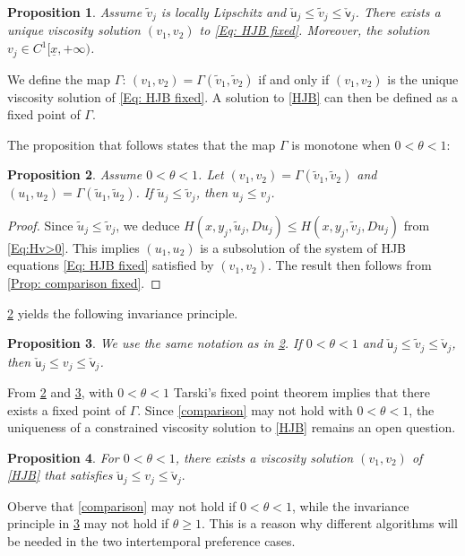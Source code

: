 \documentclass[11pt]{article}
\numberwithin{equation}{section}
\numberwithin{algorithm}{section}
\newtheorem{proposition}[proposition]{Proposition}
\def\su{{\mathsf{u}}}
\def\sv{{\mathsf{v}}}
\newcommand{\ux}{{\underline x}}
\theoremstyle{plain}
\begin{document}
\begin{proposition}
Assume $\widetilde{v}_j$ is locally Lipschitz and $\check{\su}_j\leq \widetilde{v}_j\leq \check{\sv}_j$. There exists a unique viscosity solution $(v_1,v_2)$ to \cref{Eq: HJB fixed}. Moreover, the solution $v_j\in C^1[\ux,+\infty)$. 
\end{proposition}
We define the map $\Gamma$: $(v_1,v_2)=\Gamma(\widetilde{v}_1,\widetilde{v}_2)$ if and only if $(v_1,v_2)$ is the unique viscosity solution of \cref{Eq: HJB fixed}.
A solution to \cref{HJB} can then be defined as a fixed point of $\Gamma$.\par
The proposition that follows states that the map $\Gamma$ is monotone when $0<\theta<1$:
\begin{proposition}\label{Prop: ordering}
Assume $0<\theta<1$. Let $(v_1,v_2)=\Gamma(\widetilde{v}_1,\widetilde{v}_2)$ and $(u_1,u_2)=\Gamma(\widetilde{u}_1,\widetilde{u}_2)$. If $\widetilde{u}_j\leq \widetilde{v}_j$, then $u_j\leq v_j$. 
\end{proposition}
\begin{proof}
Since $\widetilde{u}_j\leq \widetilde{v}_j$, we deduce  
$
H(x,y_j,\widetilde{u}_j,Du_j)\leq H(x,y_j,\widetilde{v}_j,Du_j)
$
from \cref{Eq:Hv>0}. This implies $(u_1,u_2)$ is a subsolution of the system of HJB equations \cref{Eq: HJB fixed} satisfied by $(v_1,v_2)$. The result then follows from \cref{Prop: comparison fixed}.
\end{proof}
\cref{Prop: ordering} yields the following invariance principle. 
\begin{proposition}\label{Prop: invariance}
We use the same notation as in \cref{Prop: ordering}. If $0<\theta<1$ and $\check{\su}_j\leq \widetilde{v}_j\leq \check{\sv}_j$, then $\check{\su}_j\leq v_j\leq \check{\sv}_j$. 
\end{proposition}
From \cref{Prop: ordering} and \cref{Prop: invariance}, with $0<\theta<1$ Tarski's fixed point theorem implies that there exists a fixed point of $\Gamma$. Since \cref{comparison} may not hold with $0<\theta<1$, the uniqueness of a constrained viscosity solution to \cref{HJB} remains an open question. 
\begin{proposition}\label{Prop: vis sol bound}
For $0<\theta<1$, there exists a viscosity solution $(v_1,v_2)$ of \cref{HJB} that satisfies
$
\check{\su}_j\leq v_j\leq \check{\sv}_j.
$
\end{proposition}
Oberve that \cref{comparison} may not hold if $0<\theta<1$, while the invariance principle in \cref{Prop: invariance} may not hold if $\theta \geq 1$. This is a reason why different algorithms will be needed in the two intertemporal preference cases. 
\end{document}

